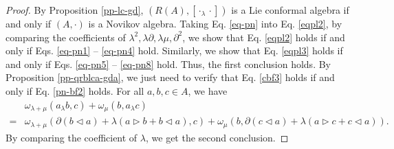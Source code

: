 \documentclass[12pt]{amsart}
\begin{document}
\begin{proof}
By Proposition \ref{pp-lc-gd}, $(R(A),[\cdot_\lambda \cdot])$ is a
Lie conformal algebra if and only if $(A,\cdot)$ is a Novikov
algebra. Taking Eq. \eqref{eq-pn} into Eq. \eqref{eqpl2}, by
comparing the coefficients of
$\lambda^2,\lambda\partial,\lambda\mu,\partial^2$, we show that
 Eq. \eqref{eqpl2} holds if and only if Eqs. \eqref{eq-pn1} -- \eqref{eq-pn4} hold. Similarly, we  show that Eq. \eqref{eqpl3} holds if and only if  Eqs. \eqref{eq-pn5} -- \eqref{eq-pn8} hold. Thus, the first conclusion holds. By  Proposition \ref{pp-qrblca-gda}, we just need to verify that
Eq. \eqref{cbf3} holds if and only if Eq. \eqref{pn-bf2} holds.
For all $a,b, c\in A$, we have
 \begin{align*}
    &\omega_{\lambda+\mu}(a_\lambda b,c)+\omega_\mu(b,a_\lambda c)\\
    =&\omega_{\lambda+\mu}(\partial(b\lhd a)+\lambda(a\rhd b+b\lhd a),c )+\omega_{\mu}(b, \partial(c\lhd a)+\lambda(a\rhd c+c\lhd a)).
\end{align*}
 By comparing the coefficient of $\lambda$, we get the second conclusion.
\end{proof}
\end{document}
